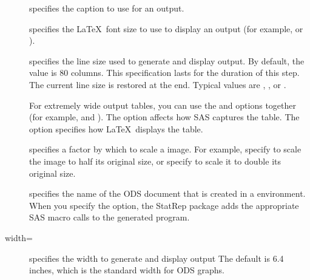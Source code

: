 \documentclass[article,oneside]{memoir}
\newcommand*{\StatRep}{\textsf{StatRep}\xspace}
\begin{document}
  \begin{description}
     \item[] specifies the caption to use for an output.

     \item[] specifies the \LaTeX\ font size to use to display an output
    (for example,  or ).

     \item[] specifies the line size used to generate and display
      output. By default, the value is 80 columns.
     This specification lasts for the duration of this step. The current line size is
     restored at the end.
     Typical values are , , or .

     For extremely wide output tables, you can use the  and 
     options together (for example,  and ).
     The  option affects how SAS captures the table. The 
     option specifies how \LaTeX\ displays the table.%

     \item[] specifies a factor by which to scale a  image.
     For example, specify  to scale the image to half its original size,
     or specify  to scale it to double its original size.

    \item[] specifies the name of the ODS document that is created in a
      environment. When you specify the  option,
     the \StatRep package adds the appropriate SAS macro calls to the
     generated program.

     \item[width=] specifies the width to generate and display  output
           The default is 6.4 inches, which is the standard width for ODS graphs.

  \end{description}
\end{document}
